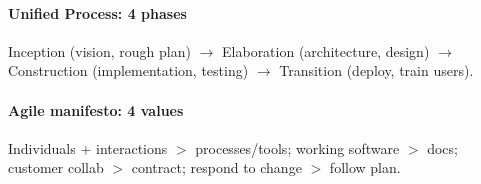 \paragraph{Unified Process: 4 phases}
\textcolor{Bittersweet}{Inception} (vision, rough plan) $\to$ \textcolor{Bittersweet}{Elaboration} (architecture, design) $\to$ \textcolor{Bittersweet}{Construction} (implementation, testing) $\to$ \textcolor{Bittersweet}{Transition} (deploy, train users).

\paragraph{Agile manifesto: 4 values}
Individuals + interactions $>$ processes/tools; working software $>$ docs; customer collab $>$ contract; respond to change $>$ follow plan.

